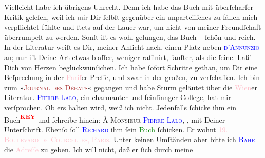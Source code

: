 \documentclass[twoside=false,titlepage=false,open=any, parskip=never, fontsize=12pt, headings=small, chapterprefix=false, appendixprefix=false]{scrbook}
\newcommand{\strikeout}[1]{\sout{#1}}
\newcommand{\pbposition}{\depth}
\newcommand{\pb}{\nobreak\hspace{0pt}\raisebox{-0.1em}{\raisebox{\pbposition}{\textnormal{|}}}\nobreak\hspace{0pt}}
\begin{document}
           \pstart
           Vielleicht habe ich übrigens Unrecht. Denn ich habe das Buch mit überſcharfer Kritik
               geleſen, weil ich \strikeout{\textcolor{gray}{mir}} Dir ſelbſt
               gegenüber ein unparteiiſches zu fällen mich verpflichtet fühlte und ſtets auf der
               Lauer war, um nicht von meiner Freundſchaft überrumpelt zu werden. Sonſt iſt es wohl
               gelungen, das Buch – ſchön und reich. In der Literatur {\pb}weiſt es Dir, meiner Anſicht nach, einen Platz neben
                  \textsc{\textcolor{blue}{d’Annunzio}{}\ledrightnote{\textcolor{blue}{Gabriele D’Annunzio}}} an; nur
               iſt Deine Art etwas blaſſer, weniger raffinirt, ſanſter, als die ſeine. Laß’ Dich von
               Herzen beglückwünſichen.\pend
           \pstart
           Ich habe ſofort Schritte gethan, um Dir eine Beſprechung in der \textcolor{pink}{Pariſ}{}\ledrightnote{\textcolor{pink}{Paris}}er Preſſe, und zwar in der großen, zu verſchaffen. Ich bin
               zum »\textsc{\textcolor{brown}{Journal des Débats}{}\ledrightnote{\textcolor{brown}{Journal des débats}}}«
               gegangen und habe Sturm geläutet über die \textcolor{pink}{Wien}{}\ledrightnote{\textcolor{pink}{Wien}}er
               Literatur. \textsc{\textcolor{blue}{Pierre Lalo}{}\ledrightnote{\textcolor{blue}{Pierre Lalo}}},
               ein charmanter und feinſinnger College, hat mir \label{K_L02622-1v}\label{K_L02622-1h} verſprochen. Ob ers halten {\pb}wird,
               weiß ich nicht. Jedenfalls ſchicke ihm ein Buch\textcolor{red}{\textsuperscript{\textbf{KEY}}} und
               ſchreibe hinein: \textsc{À Monsieur \textcolor{blue}{Pierre
                     Lalo}{}\ledrightnote{\textcolor{blue}{Pierre Lalo}}}, \textsc{\label{K_mets_Goldmann_94-partII-676v}\label{K_mets_Goldmann_94-partII-676h}}, mit Deiner Unterſchrift. Ebenſo ſoll \textsc{\textcolor{blue}{Richard}{}\ledrightnote{\textcolor{blue}{Richard Beer-Hofmann}}} ihm ſein \textcolor{green}{Buch}{} ſchicken. Er wohnt \textsc{\textcolor{pink}{19. Boulevard de Courcelles,
                     Paris}{}\ledrightnote{\textcolor{pink}{Boulevard de Courcelles}}}. Unter keinen Umſtänden aber bitte ich \textsc{\textcolor{blue}{Bahr}{}\ledrightnote{\textcolor{blue}{Hermann Bahr}}} die \textcolor{pink}{Adreſſe}{} zu geben. Ich will nicht, daß er ſich durch meine
\end{document}
